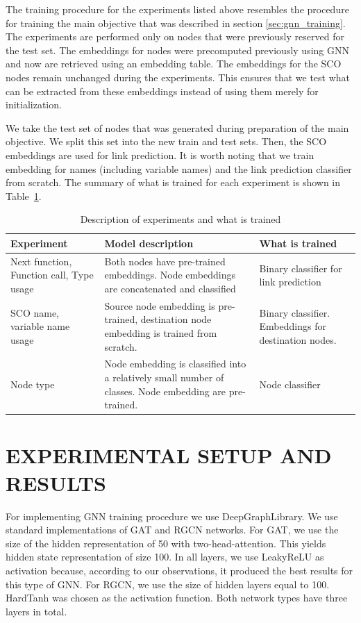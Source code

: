 \documentclass[a4paper,twoside]{article}
\begin{document}
The training procedure for the experiments listed above resembles the procedure for training the main objective that was described in section \ref{sec:gnn_training}. The experiments are performed only on nodes that were previously reserved for the test set. The embeddings for nodes were precomputed previously using GNN and now are retrieved using an embedding table. The embeddings for the SCO nodes remain unchanged during the experiments. This ensures that we test what can be extracted from these embeddings instead of using them merely for initialization. 

We take the test set of nodes that was generated during preparation of the main objective. We split this set into the new train and test sets. Then, the SCO embeddings are used for link prediction. It is worth noting that we train embedding for names (including variable names) and the link prediction classifier from scratch. The summary of what is trained for each experiment is shown in Table~\ref{tbl:experiment_desc}.

\begin{table}
    \centering
    \caption{Description of experiments and what is trained}\label{tbl:experiment_desc}
    \begin{tabular}{p{3cm}p{6cm}p{5cm}}
    \toprule
        \textbf{Experiment} & \textbf{Model description} & \textbf{What is trained} \\ \midrule
        Next function, Function call, Type usage & Both nodes have pre-trained embeddings. Node embeddings are concatenated and classified & Binary classifier for link prediction \\ \midrule
        SCO name, variable name usage & Source node embedding is pre-trained, destination node embedding is trained from scratch. & Binary classifier. Embeddings for destination nodes. \\ \midrule
        Node type & Node embedding is classified into a relatively small number of classes. Node embedding are pre-trained. & Node classifier \\ \bottomrule
    \end{tabular}
\end{table}



\section{\uppercase{Experimental Setup and Results}}\label{sec:setup}

For implementing GNN training procedure we use DeepGraphLibrary. We use standard implementations of GAT and RGCN networks. For GAT, we use the size of the hidden representation of 50 with two-head-attention. This yields hidden state representation of size 100. In all layers, we use LeakyReLU as activation because, according to our observations, it produced the best results for this type of GNN\@. For RGCN, we use the size of hidden layers equal to 100. HardTanh was chosen as the activation function. Both network types have three layers in total. 
\end{document}
